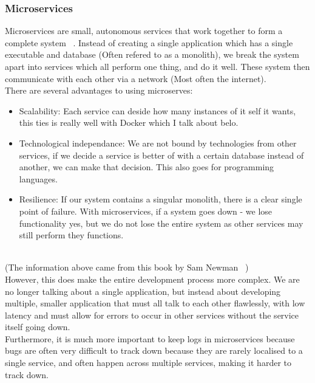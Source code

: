 \documentclass[titlepage]{article}
\begin{document}
\subsubsection{Microservices}
Microservices are small, autonomous services that work together to form a complete system ~\cite{newman_2016}. Instead of creating a single application which has a single executable and database (Often refered to as a monolith), we break the system apart into services which all perform one thing, and do it well. These system then communicate with each other via a network (Most often the internet). \\

There are several advantages to using microserves:
\begin{itemize}
  \item Scalability: Each service can deside how many instances of it self it wants, this ties is really well with Docker which I talk about belo.
  \item Technological independance: We are not bound by technologies from other services, if we decide a service is better of with a certain database instead of another, we can make that decision. This also goes for programming languages.
  \item Resilience: If our system contains a singular monolith, there is a clear single point of failure. With microservices, if a system goes down - we lose functionality yes, but we do not lose the entire system as other services may still perform they functions.
\end{itemize} \\

(The information above came from this book by Sam Newman ~\cite{newman_2016}) \\

However, this does make the entire development process more complex. We are no longer talking about a single application, but instead about developing multiple, smaller application that must all talk to each other flawlessly, with low latency and must allow for errors to occur in other services without the service itself going down. \\

Furthermore, it is much more important to keep logs in microservices because bugs are often very difficult to track down because they are rarely localised to a single service, and often happen across multiple services, making it harder to track down. \\
\end{document}
